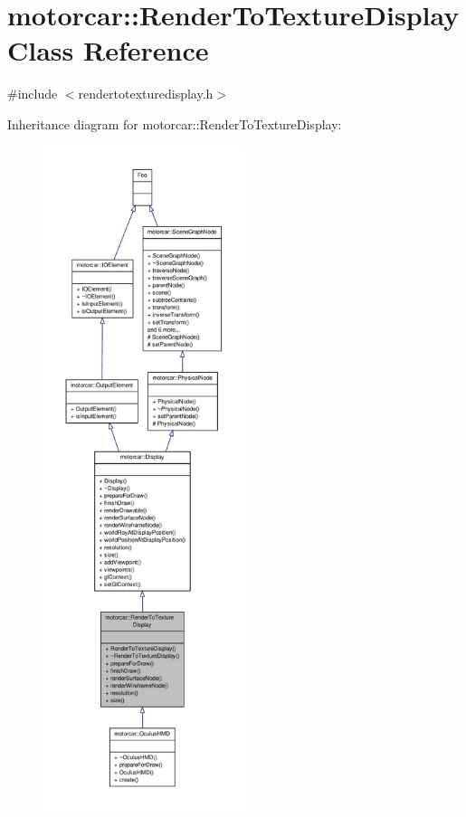 \hypertarget{classmotorcar_1_1RenderToTextureDisplay}{\section{motorcar\-:\-:Render\-To\-Texture\-Display Class Reference}
\label{classmotorcar_1_1RenderToTextureDisplay}
}


{\ttfamily \#include $<$rendertotexturedisplay.\-h$>$}



Inheritance diagram for motorcar\-:\-:Render\-To\-Texture\-Display\-:
\nopagebreak
\begin{figure}[H]
\begin{center}
\leavevmode
\includegraphics[height=550pt]{classmotorcar_1_1RenderToTextureDisplay__inherit__graph}
\end{center}
\end{figure}


